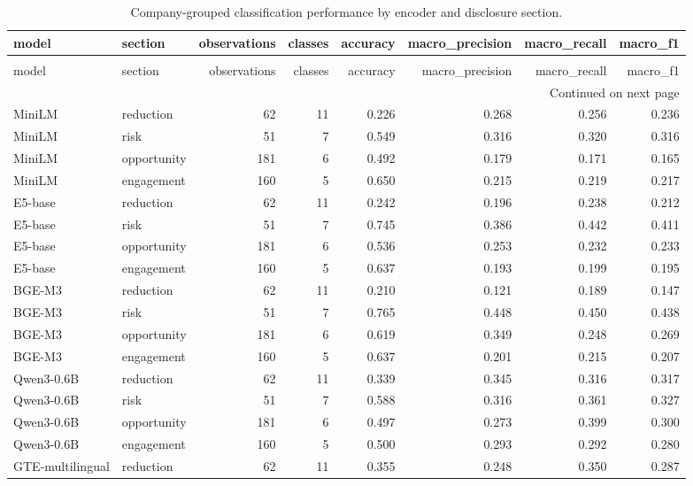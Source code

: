 \begin{longtable}{llrrrrrr}
\caption{Company-grouped classification performance by encoder and disclosure section.} \label{tab:cdp_text_classification_models} \\
\toprule
model & section & observations & classes & accuracy & macro\_precision & macro\_recall & macro\_f1 \\
\midrule
\endfirsthead
\caption[]{Company-grouped classification performance by encoder and disclosure section.} \\
\toprule
model & section & observations & classes & accuracy & macro\_precision & macro\_recall & macro\_f1 \\
\midrule
\endhead
\midrule
\multicolumn{8}{r}{Continued on next page} \\
\midrule
\endfoot
\bottomrule
\endlastfoot
MiniLM & reduction & 62 & 11 & 0.226 & 0.268 & 0.256 & 0.236 \\
MiniLM & risk & 51 & 7 & 0.549 & 0.316 & 0.320 & 0.316 \\
MiniLM & opportunity & 181 & 6 & 0.492 & 0.179 & 0.171 & 0.165 \\
MiniLM & engagement & 160 & 5 & 0.650 & 0.215 & 0.219 & 0.217 \\
E5-base & reduction & 62 & 11 & 0.242 & 0.196 & 0.238 & 0.212 \\
E5-base & risk & 51 & 7 & 0.745 & 0.386 & 0.442 & 0.411 \\
E5-base & opportunity & 181 & 6 & 0.536 & 0.253 & 0.232 & 0.233 \\
E5-base & engagement & 160 & 5 & 0.637 & 0.193 & 0.199 & 0.195 \\
BGE-M3 & reduction & 62 & 11 & 0.210 & 0.121 & 0.189 & 0.147 \\
BGE-M3 & risk & 51 & 7 & 0.765 & 0.448 & 0.450 & 0.438 \\
BGE-M3 & opportunity & 181 & 6 & 0.619 & 0.349 & 0.248 & 0.269 \\
BGE-M3 & engagement & 160 & 5 & 0.637 & 0.201 & 0.215 & 0.207 \\
Qwen3-0.6B & reduction & 62 & 11 & 0.339 & 0.345 & 0.316 & 0.317 \\
Qwen3-0.6B & risk & 51 & 7 & 0.588 & 0.316 & 0.361 & 0.327 \\
Qwen3-0.6B & opportunity & 181 & 6 & 0.497 & 0.273 & 0.399 & 0.300 \\
Qwen3-0.6B & engagement & 160 & 5 & 0.500 & 0.293 & 0.292 & 0.280 \\
GTE-multilingual & reduction & 62 & 11 & 0.355 & 0.248 & 0.350 & 0.287 \\

\end{longtable}
